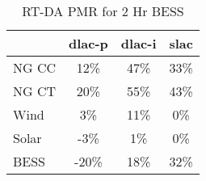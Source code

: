 \begin{table}[htbp]
\centering
\begin{tabular}{lccc}
\toprule
\hline
 & dlac-p & dlac-i & slac \\
\hline
\quad NG CC & 12\% & 47\% & 33\% \\
\quad NG CT & 20\% & 55\% & 43\% \\
\quad Wind & 3\% & 11\% & 0\% \\
\quad Solar & -3\% & 1\% & 0\% \\
\quad BESS & -20\% & 18\% & 32\% \\
\hline
\bottomrule
\end{tabular}
\caption{RT-DA PMR for 2 Hr BESS}
\label{tab:table4_2_Hr_BESS}
\end{table}
